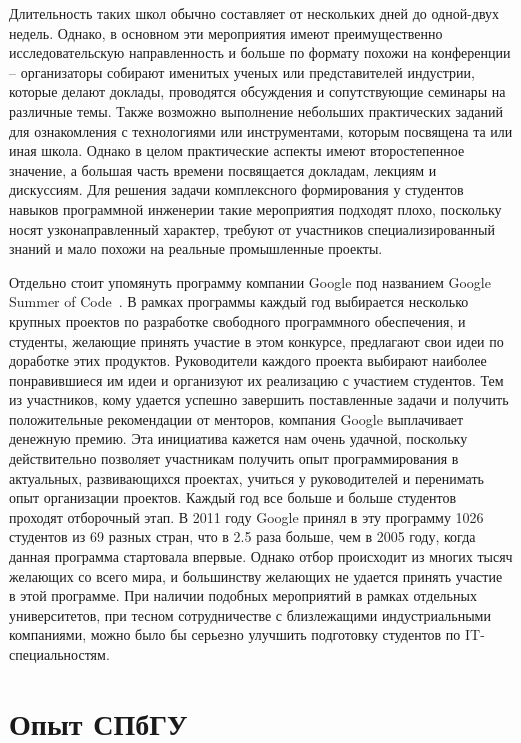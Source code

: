 \documentclass[a5paper]{article}
\begin{document}
Длительность таких школ обычно составляет от нескольких дней до одной-двух недель. Однако, в основном эти мероприятия имеют преимущественно исследовательскую направленность  и больше по формату похожи на конференции -- организаторы собирают именитых ученых или представителей индустрии, которые делают доклады, проводятся обсуждения и сопутствующие семинары на различные темы. Также возможно выполнение небольших практических заданий для ознакомления с технологиями или инструментами, которым посвящена та или иная школа. Однако в целом практические аспекты имеют второстепенное значение, а большая часть времени посвящается докладам, лекциям и дискуссиям. Для решения задачи комплексного формирования у студентов навыков программной инженерии такие мероприятия подходят плохо, поскольку носят узконаправленный характер, требуют от участников специализированный знаний и мало похожи на  реальные промышленные проекты.

Отдельно стоит упомянуть программу компании Google под названием Google Summer of Code~\cite{google}. В рамках программы каждый год выбирается несколько крупных проектов по разработке свободного программного обеспечения, и студенты, желающие принять участие в этом конкурсе, предлагают свои идеи по доработке этих продуктов. Руководители каждого проекта выбирают наиболее понравившиеся им идеи и организуют их реализацию с участием студентов. Тем из участников, кому удается успешно завершить поставленные задачи и получить положительные рекомендации от менторов, компания Google выплачивает денежную премию. Эта инициатива  кажется нам очень удачной, поскольку действительно позволяет участникам получить опыт программирования в актуальных, развивающихся проектах, учиться у руководителей и перенимать опыт организации проектов. Каждый год все больше и больше студентов проходят отборочный этап.  В 2011 году Google принял в эту программу 1026 студентов из 69 разных стран, что в 2.5 раза больше, чем в 2005 году, когда данная программа стартовала впервые. Однако отбор происходит из многих тысяч желающих со всего мира, и большинству желающих не удается принять участие в этой программе. При наличии подобных мероприятий в рамках отдельных университетов, при тесном сотрудничестве с близлежащими индустриальными компаниями, можно было бы серьезно улучшить подготовку студентов по IT-специальностям.

\section{Опыт СПбГУ}
\end{document}
